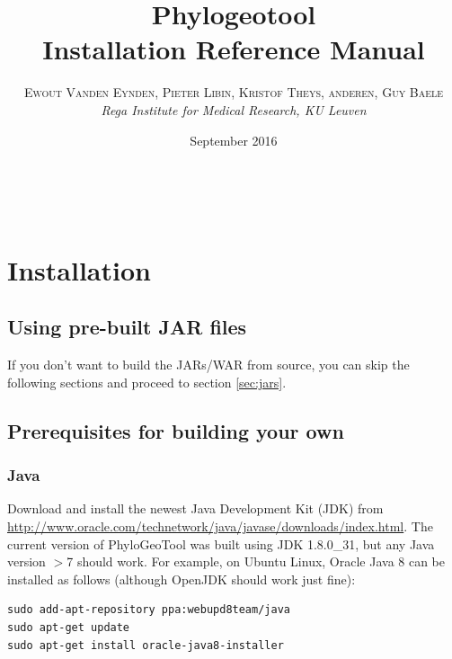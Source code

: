 \documentclass[a4paper, 11pt]{article} %
\title{\textbf{Phylogeotool}\\ %
Installation Reference Manual} %
\author{\textsc{Ewout Vanden Eynden, Pieter Libin, Kristof Theys, anderen, Guy Baele} %
\\{\textit{Rega Institute for Medical Research, KU Leuven}}} %
\date{September 2016} %
\makeatletter
\renewcommand{\maketitle}{ %
\begin{flushright} %
{\LARGE\@title} %

\vspace{50pt} %

{\large\@author} %
\\\@date %

\vspace{40pt} %
\end{flushright}
}
\makeatother
\begin{document}
\maketitle %

\vspace{30pt} %

\tableofcontents
\newpage

\section{Installation}

\subsection{Using pre-built JAR files}
If you don't want to build the JARs/WAR from source, you can skip the following sections and proceed to section \ref{sec:jars}.



\subsection{Prerequisites for building your own}

\subsubsection*{Java}
Download and install the newest Java Development Kit (JDK) from \url{http://www.oracle.com/technetwork/java/javase/downloads/index.html}.
The current version of PhyloGeoTool was built using JDK 1.8.0\_31, but any Java version $>$7 should work.
For example, on Ubuntu Linux, Oracle Java 8 can be installed as follows (although OpenJDK should work just fine):
\begin{verbatim} 
sudo add-apt-repository ppa:webupd8team/java
sudo apt-get update
sudo apt-get install oracle-java8-installer
\end{verbatim}
\end{document}
